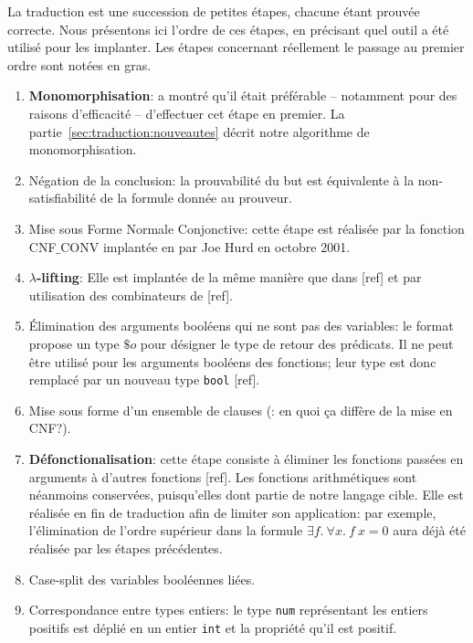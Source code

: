 La traduction est une succession de petites étapes, chacune étant
prouvée correcte. Nous présentons ici l'ordre de ces étapes, en
précisant quel outil a été utilisé pour les implanter. Les étapes
concernant réellement le passage au premier ordre sont notées en gras.
\begin{enumerate}
\item \textbf{Monomorphisation}: \cite{MengP08} a montré qu'il était
  préférable -- notamment pour des raisons d'efficacité -- d'effectuer
  cet étape en premier. La
  partie~\ref{sec:traduction:nouveautes} décrit notre
  algorithme de monomorphisation.
  \item Négation de la conclusion: la prouvabilité du but est
    équivalente à la non-satisfiabilité de la formule donnée au
    prouveur.
  \item Mise sous Forme Normale Conjonctive: cette étape est réalisée
    par la fonction \textsf{CNF$\_$CONV} implantée en \holfour par Joe
    Hurd en octobre 2001.
  \item \textbf{$\lambda$-lifting}: Elle est
    implantée de la même manière que dans [\todo ref] et par utilisation
    des combinateurs de [\todo ref].
  \item Élimination des arguments booléens qui ne sont pas des
    variables: le format \tff propose un type $\$o$ pour désigner le
    type de retour des prédicats. Il ne peut être utilisé pour les
    arguments booléens des fonctions; leur type est donc remplacé par un
    nouveau type \verb!bool! [\todo ref].
  \item Mise sous forme d'un ensemble de clauses (\todo : en quoi ça
    diffère de la mise en CNF?).
  \item \textbf{Défonctionalisation}: cette étape consiste à éliminer
    les fonctions passées en arguments à d'autres fonctions [\todo ref].
    Les fonctions arithmétiques sont néanmoins conservées, puisqu'elles
    dont partie de notre langage cible. Elle est réalisée en fin de
    traduction afin de limiter son application: par exemple,
    l'élimination de l'ordre supérieur dans la formule $\exists f.\
    \forall x.\ f\ x = 0$ aura déjà été réalisée par les étapes
    précédentes.
  \item Case-split des variables booléennes liées.
  \item Correspondance entre types entiers: le type \holfour \verb!num!
    représentant les entiers positifs est déplié en un entier \verb!int!
    et la propriété qu'il est positif.
\end{enumerate}

